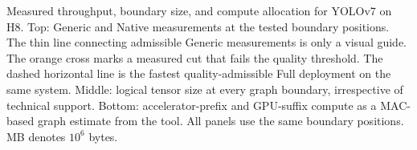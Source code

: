Measured throughput, boundary size, and compute allocation for YOLOv7 on H8. Top: Generic and Native measurements at the tested boundary positions. The thin line connecting admissible Generic measurements is only a visual guide. The orange cross marks a measured cut that fails the quality threshold. The dashed horizontal line is the fastest quality-admissible Full deployment on the same system. Middle: logical tensor size at every graph boundary, irrespective of technical support. Bottom: accelerator-prefix and GPU-suffix compute as a MAC-based graph estimate from the tool. All panels use the same boundary positions. MB denotes $10^6$ bytes.
